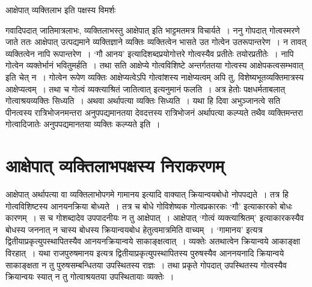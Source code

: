 {आक्षेपात् व्यक्तिलाभ इति पक्षस्य विमर्शः

गवादिपदात् जातिमात्रलाभः, व्यक्तिलाभस्तु आक्षेपात् इति भाट्टमतमत्र विचार्यते~। ननु गोपदात् गोत्वस्मरणे जाते ततः आक्षेपात् उत्पद्यमाने व्यक्तिज्ञाने व्यक्तिः व्यक्तित्वेन भासते उत गोत्वेन उतरूपान्तरेण~। न तावत् व्यक्तित्वेन नापि रूपान्तरेण~। ‘गौ आनय’ इत्यादिशब्दप्रयोगोत्तरे गोत्वस्यैव प्रतीतेः तयोरप्रतीतेः~। नापि गोत्वेन व्यक्तेर्भानं भवितुमर्हति~। तथा सति आक्षेप्ये गोत्वविशिष्टे अन्तर्गततया गोत्वस्य आक्षेपकत्वसम्भवात् इति चेत् न~। गोत्वेन रूपेण व्यक्तिः आक्षेप्यत्वेऽपि गोत्वांशस्य नाक्षेप्यत्वम् अपि तु, विशेष्यभूतव्यक्तिमात्रस्य आक्षेप्यत्वम्~। तथा च गोत्वं व्यक्त्याश्रितं जातित्वात् इत्यनुमानं फलति~। अत्र हेतोः पक्षधर्मताबलात् गोत्वाश्रयव्यक्तिः सिध्यति~। अथवा अर्थापत्या व्यक्तिः सिध्यति~। यथा हि दिवा अभुञ्जानत्वे सति पीनत्वस्य रात्रिभोजनमन्तरा अनुपपद्यमानतया देवदत्तस्य रात्रिभोजनं अर्थापत्या कल्प्यते तथैव व्यक्तिमन्तरा गोत्वादिजातेः अनुपपद्यमानतया व्यक्तिः कल्प्यते इति~। 

\section*{आक्षेपात् व्यक्तिलाभपक्षस्य निराकरणम्} 

आक्षेपात् अर्थापत्या वा व्यक्तिलाभोपगमे गामानय इत्यादि वाक्यात् क्रियान्वयबोधो नोपपद्यते~। तत्र हि गोत्वविशिष्टस्य आनयनक्रिया बोध्यते~। तत्र च बोधे गोविशेष्यक गोत्वप्रकारकः ‘गौ’ इत्याकारको बोधः कारणम्~। स च गोशब्दादेव उपपादनीयः न तु आक्षेपात्~। आक्षेपात् ‘गोत्वं व्यक्त्याश्रितम्’ इत्याकारकस्यैव बोधस्य जननात्  न चास्य बोधस्य क्रियान्वयबोध हेतुत्वमात्रमिति वाच्यम्~। ‘गामानय’ इत्यत्र द्वितीयाप्रकृत्युपस्थापितस्यैव आनयनक्रियान्वये साकाङ्क्षत्वात्~। व्यक्तेः अतथात्वेन क्रियान्वये आकाङ्क्षा विरहात्~। यथा राजपुरुषमानय इत्यत्र द्वितीयाप्रकृत्युपस्थापितस्य पुरुषस्यैव आननयनादि क्रियान्वये साकाङ्क्षता न तु पुरुषसम्बन्धितया उपस्थितस्य राज्ञः~। तथा प्रकृते गोपदात् उपस्थितस्य गोत्वस्यैव क्रियान्वयः स्यात् न तु गोत्वाश्रयतया उपस्थितायाः व्यक्तेः~। 

\articleend
}
